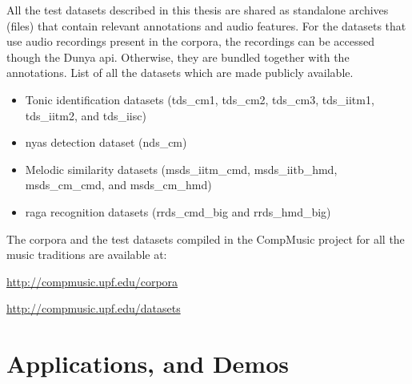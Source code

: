 All the test datasets described in this thesis are shared as standalone archives (files) that contain relevant annotations and audio features. For the datasets that use audio recordings present in the corpora, the recordings can be accessed though the Dunya \acrshort{api}. Otherwise, they are bundled together with the annotations. List of all the datasets which are made publicly available.
\begin{itemize}
	\item Tonic identification datasets (\acrshort{tds_cm1}, \acrshort{tds_cm2}, \acrshort{tds_cm3}, \acrshort{tds_iitm1}, \acrshort{tds_iitm2}, and \acrshort{tds_iisc})
	\item \Gls{nyas} detection dataset (\acrshort{nds_cm})
	\item Melodic similarity datasets (\acrshort{msds_iitm_cmd}, \acrshort{msds_iitb_hmd}, \acrshort{msds_cm_cmd}, and \acrshort{msds_cm_hmd})
	\item \Gls{raga} recognition datasets (\acrshort{rrds_cmd_big} and \acrshort{rrds_hmd_big})
\end{itemize}

The corpora and the test datasets compiled in the CompMusic project for all the music traditions are available at:
\begin{description}[style=nextline]
	\item[CompMusic music corpora] \url{http://compmusic.upf.edu/corpora}
	\item[CompMusic test datasets] \url{http://compmusic.upf.edu/datasets}
\end{description}


\section*{Applications, and Demos}

